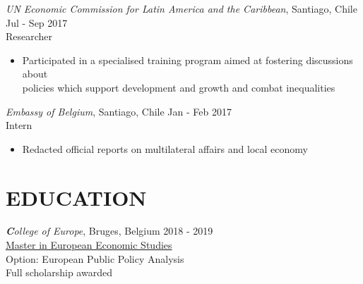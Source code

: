 \documentclass[margin,a4paper]{res}
\begin{document}
\begin{resume}
                {\sl UN Economic Commission for Latin America and the Caribbean}, Santiago, Chile \hfill 	Jul - Sep 2017  \\
		Researcher
		\begin{itemize}  \itemsep -2pt %
                 \item[--] Participated in a specialised training program aimed at fostering discussions about \\policies which support development and growth and combat inequalities
                                 \end{itemize}


                 {\sl Embassy of Belgium}, Santiago, Chile \hfill            Jan - Feb 2017 \\
                 Intern %
		\begin{itemize}  \itemsep -2pt %
                 \item[--] Redacted official reports on multilateral affairs and local economy %
                \end{itemize}

                




 
\section{EDUCATION}
		{\sl  \textbf College of Europe}, Bruges, Belgium \hfill                   2018 -  2019 \\
                 \href{https://www.coleurope.eu/page-ref/mees-option-european-public-policy-analysis}{Master in European Economic Studies} \\
                Option: European Public Policy Analysis\\
                Full scholarship awarded


\end{resume}
\end{document}
